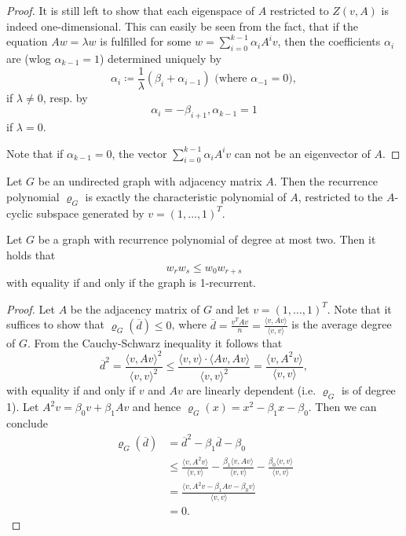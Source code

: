\documentclass[a4paper,12pt]{article}
\begin{document}
\begin{proof}
It is still left to show that each eigenspace of $A$ restricted to $Z(v,A)$ is indeed one-dimensional.
This can easily be seen from the fact, that if the equation $Aw = \lambda w$ is fulfilled for some $w = \sum_{i=0}^{k-1}\alpha_iA^iv$, then the coefficients $\alpha_i$ are (wlog $\alpha_{k-1} = 1$) determined uniquely by
$$ \alpha_i \coloneqq \frac 1 \lambda \left(\beta_i + \alpha_{i-1}\right) \text{ (where $\alpha_{-1} = 0$)}, $$
if $\lambda \neq 0$, resp. by
$$
\alpha_i= -\beta_{i+1}, \alpha_{k-1} = 1
$$
if $\lambda = 0$.

Note that if $\alpha_{k-1} = 0$, the vector $\sum_{i=0}^{k-1}\alpha_iA^iv$ can not be an eigenvector of $A$.

\end{proof}

\begin{cor}
Let $G$ be an undirected graph with adjacency matrix $A$. Then the recurrence polynomial $\varrho_G$ is exactly the characteristic polynomial of $A$, restricted to the $A$-cyclic subspace generated by $v = (1, \ldots, 1)^T$.
\end{cor}
%

\begin{cor}
Let $G$ be a graph with recurrence polynomial of degree at most two. Then it holds that $$w_rw_s \le w_0w_{r+s}$$
with equality if and only if the graph is 1-recurrent.
\end{cor}

\begin{proof}
Let $A$ be the adjacency matrix of $G$ and let $v = (1, \ldots, 1)^T$.
Note that it suffices to show that $\varrho_G(\overline{d}) \le 0$, where $\overline{d} = \frac{v^TAv}n = \frac{\langle v,Av \rangle}{\langle v,v\rangle}$ is the average degree of $G$.
From the Cauchy-Schwarz inequality it follows that
$$
\overline{d}^2 = \frac {\langle v, Av \rangle^2}{\langle v,v\rangle^2} \le \frac {\langle v,v\rangle \cdot \langle Av,Av\rangle}{\langle v,v\rangle^2} = \frac {\langle v,A^2v\rangle}{\langle v,v\rangle},
$$
with equality if and only if $v$ and $Av$ are linearly dependent (i.e. $\varrho_G$ is of degree 1).
Let $A^2v = \beta_0v + \beta_1Av$ and hence $\varrho_G(x) = x^2-\beta_1x-\beta_0$. Then we can conclude
\begin{align*}
\varrho_G(\overline{d}) &= \overline{d}^2-\beta_1\overline{d} - \beta_0\\
&\le \frac {\langle v,A^2v \rangle}{\langle v,v\rangle} - \frac {\beta_1 \langle v,Av \rangle}{\langle v,v\rangle} - \frac{\beta_0 \langle v,v\rangle}{\langle v,v\rangle}\\
&= \frac {\langle v,A^2v - \beta_1Av-\beta_0v\rangle}{\langle v,v\rangle}\\
&= 0.
\end{align*}
\end{proof}
\end{document}
